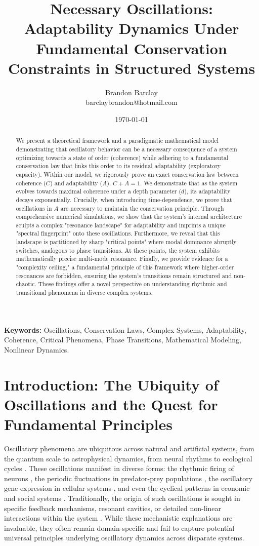 \documentclass[11pt,a4paper]{article}
\title{\LARGE\bf Necessary Oscillations: Adaptability Dynamics Under Fundamental Conservation Constraints in Structured Systems}
\author{Brandon Barclay\\
\normalsize{barclaybrandon@hotmail.com}}
\date{\today}
\begin{document}
\maketitle

\begin{abstract}
We present a theoretical framework and a paradigmatic mathematical model demonstrating that oscillatory behavior can be a necessary consequence of a system optimizing towards a state of order (coherence) while adhering to a fundamental conservation law that links this order to its residual adaptability (exploratory capacity). Within our model, we rigorously prove an exact conservation law between coherence ($C$) and adaptability ($A$), $C+A=1$. We demonstrate that as the system evolves towards maximal coherence under a depth parameter ($d$), its adaptability decays exponentially. Crucially, when introducing time-dependence, we prove that oscillations in $A$ are necessary to maintain the conservation principle. Through comprehensive numerical simulations, we show that the system's internal architecture sculpts a complex "resonance landscape" for adaptability and imprints a unique "spectral fingerprint" onto these oscillations. Furthermore, we reveal that this landscape is partitioned by sharp "critical points" where modal dominance abruptly switches, analogous to phase transitions. At these points, the system exhibits mathematically precise multi-mode resonance. Finally, we provide evidence for a "complexity ceiling," a fundamental principle of this framework where higher-order resonances are forbidden, ensuring the system's transitions remain structured and non-chaotic. These findings offer a novel perspective on understanding rhythmic and transitional phenomena in diverse complex systems.
\end{abstract}

\textbf{Keywords:} Oscillations, Conservation Laws, Complex Systems, Adaptability, Coherence, Critical Phenomena, Phase Transitions, Mathematical Modeling, Nonlinear Dynamics.

\section{Introduction: The Ubiquity of Oscillations and the Quest for Fundamental Principles}

Oscillatory phenomena are ubiquitous across natural and artificial systems, from the quantum scale to astrophysical dynamics, from neural rhythms to ecological cycles \cite{Strogatz2015,Pikovsky2003,Buzsaki2006}. These oscillations manifest in diverse forms: the rhythmic firing of neurons \cite{Buzsaki2006}, the periodic fluctuations in predator-prey populations \cite{Winfree2001}, the oscillatory gene expression in cellular systems \cite{Kauffman1993}, and even the cyclical patterns in economic and social systems \cite{Haken2006}. Traditionally, the origin of such oscillations is sought in specific feedback mechanisms, resonant cavities, or detailed non-linear interactions within the system \cite{Winfree2001}. While these mechanistic explanations are invaluable, they often remain domain-specific and fail to capture potential universal principles underlying oscillatory dynamics across disparate systems.
\end{document}
